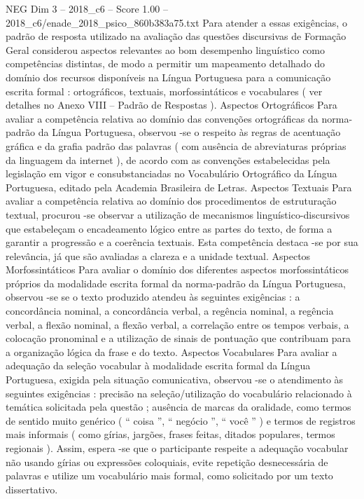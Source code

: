 \begin{textsample}{NEG Dim 3 – 2018\_c6 – Score 1.00 – 2018\_c6/enade\_2018\_psico\_860b383a75.txt}
Para atender a essas exigências, o padrão de resposta utilizado na avaliação das questões discursivas de Formação Geral considerou aspectos relevantes ao bom desempenho linguístico como competências distintas, de modo a permitir um mapeamento detalhado do domínio dos recursos disponíveis na Língua Portuguesa para a comunicação escrita formal : ortográficos, textuais, morfossintáticos e vocabulares ( ver detalhes no Anexo VIII – Padrão de Respostas ).
Aspectos Ortográficos Para avaliar a competência relativa ao domínio das convenções ortográficas da norma-padrão da Língua Portuguesa, observou -se o respeito às regras de acentuação gráfica e da grafia padrão das palavras ( com ausência de abreviaturas próprias da linguagem da internet ), de acordo com as convenções estabelecidas pela legislação em vigor e consubstanciadas no Vocabulário Ortográfico da Língua Portuguesa, editado pela Academia Brasileira de Letras.
Aspectos Textuais Para avaliar a competência relativa ao domínio dos procedimentos de estruturação textual, procurou -se observar a utilização de mecanismos linguístico-discursivos que estabeleçam o encadeamento lógico entre as partes do texto, de forma a garantir a progressão e a coerência textuais.
Esta competência destaca -se por sua relevância, já que são avaliadas a clareza e a unidade textual.
Aspectos Morfossintáticos Para avaliar o domínio dos diferentes aspectos morfossintáticos próprios da modalidade escrita formal da norma-padrão da Língua Portuguesa, observou -se se o texto produzido atendeu às seguintes exigências : a concordância nominal, a concordância verbal, a regência nominal, a regência verbal, a flexão nominal, a flexão verbal, a correlação entre os tempos verbais, a colocação pronominal e a utilização de sinais de pontuação que contribuam para a organização lógica da frase e do texto.
Aspectos Vocabulares Para avaliar a adequação da seleção vocabular à modalidade escrita formal da Língua Portuguesa, exigida pela situação comunicativa, observou -se o atendimento às seguintes exigências : precisão na seleção/utilização do vocabulário relacionado à temática solicitada pela questão ; ausência de marcas da oralidade, como termos de sentido muito genérico ( “ coisa ”, “ negócio ”, “ você ” ) e termos de registros mais informais ( como gírias, jargões, frases feitas, ditados populares, termos regionais ).
Assim, espera -se que o participante respeite a adequação vocabular não usando gírias ou expressões coloquiais, evite repetição desnecessária de palavras e utilize um vocabulário mais formal, como solicitado por um texto dissertativo.

\end{textsample}
